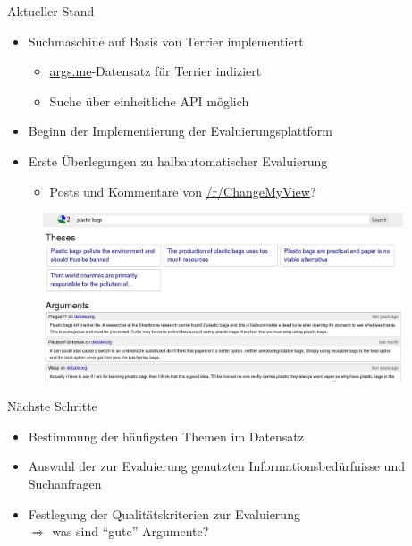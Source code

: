 \documentclass{beamer}
\begin{document}
	\begin{frame}{Aktueller Stand}
		\begin{itemize}
			\item Suchmaschine auf Basis von Terrier implementiert
			\begin{itemize}
				\item \url{args.me}-Datensatz für Terrier indiziert
				\item Suche über einheitliche API möglich
			\end{itemize}
			\item Beginn der Implementierung der Evaluierungsplattform
			\item Erste Überlegungen zu halbautomatischer Evaluierung
			\begin{itemize}
				\item Posts und Kommentare von \url{/r/ChangeMyView}?
			\end{itemize}
		\end{itemize}
		\begin{figure}
			\includegraphics[width=0.95\textwidth]{img/searchui-prototype}
		\end{figure}
	\end{frame}
	\begin{frame}{Nächste Schritte}
		\begin{itemize}
			\item Bestimmung der häufigsten Themen im Datensatz
			\item Auswahl der zur Evaluierung genutzten Informationsbedürfnisse und Suchanfragen
			\item Festlegung der Qualitätskriterien zur Evaluierung\\
			$\Rightarrow$ was sind ``gute'' Argumente?
		\end{itemize}
	\end{frame}
\end{document}
